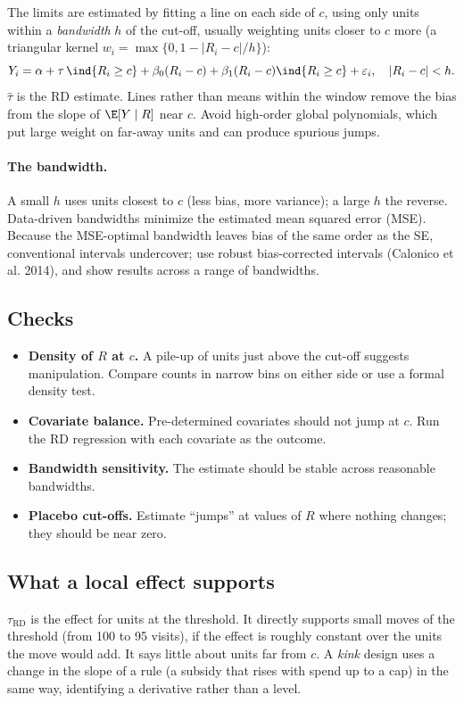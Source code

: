 \documentclass[11pt]{article}
\begin{document}
The limits are estimated by fitting a line on each side of $c$, using only units within a \emph{bandwidth} $h$ of the cut-off, usually weighting
units closer to $c$ more (a triangular kernel $w_i = \max\{0, 1 - |R_i - c|/h\}$):
\[
  Y_i = \alpha + \tau\,\ind{R_i \ge c} + \beta_0(R_i - c) + \beta_1(R_i - c)\ind{R_i \ge c} + \varepsilon_i, \quad |R_i - c| < h .
\]
$\hat\tau$ is the RD estimate. Lines rather than means within the window remove the bias from the slope of $\E[Y \mid R]$ near $c$. Avoid high-order global
polynomials, which put large weight on far-away units and can produce spurious jumps.

\paragraph{The bandwidth.} A small $h$ uses units closest to $c$ (less bias, more variance); a large $h$ the reverse. Data-driven bandwidths minimize
the estimated mean squared error (MSE). Because the MSE-optimal bandwidth leaves bias of the same order as the SE, conventional intervals undercover;
use robust bias-corrected intervals (Calonico et al. 2014), and show results across a range of bandwidths.

\subsection{Checks}

\begin{itemize}
  \item \textbf{Density of $R$ at $c$.} A pile-up of units just above the cut-off suggests manipulation. Compare counts in narrow bins on either side or
  use a formal density test.
  \item \textbf{Covariate balance.} Pre-determined covariates should not jump at $c$. Run the RD regression with each covariate as the outcome.
  \item \textbf{Bandwidth sensitivity.} The estimate should be stable across reasonable bandwidths.
  \item \textbf{Placebo cut-offs.} Estimate ``jumps'' at values of $R$ where nothing changes; they should be near zero.
\end{itemize}

\subsection{What a local effect supports}

$\tau_{\text{RD}}$ is the effect for units at the threshold. It directly supports small moves of the threshold (from 100 to 95 visits), if the effect is
roughly constant over the units the move would add. It says little about units far from $c$. A \emph{kink} design uses a change in the slope of a
rule (a subsidy that rises with spend up to a cap) in the same way, identifying a derivative rather than a level.
\end{document}
